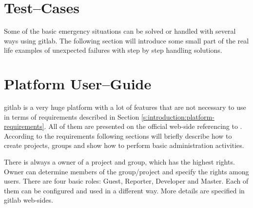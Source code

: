 \chapter{Test--Cases} \label{chp:test-cases}
	Some of the basic emergency situations can be solved or handled with several ways using \gls{gitlab}. The following section will introduce some small part of the real life examples of unexpected failures with step by step handling solutions.
	
%	
\chapter{Platform User--Guide} \label{chp:platform-user-guide}
	\gls{gitlab} is a very huge platform with a lot of features that are not necessary to use in terms of requirements described in Section \ref{s:introduction:platform-requirements}. All of them are presented on the official web-side referencing to \cite{bib:gitlabce-documentation-overview}. According to the requirements following sections will briefly describe how to create projects, groups and show how to perform basic administration activities. 	
	
	There is always a owner of a project and group, which has the highest rights. Owner can determine members of the group/project and specify the rights among users. There are four basic roles: Guest, Reporter, Developer and Master. Each of them can be configured and used in a different way. More details are specified in \gls{gitlab} web-sides.
	
	
	
